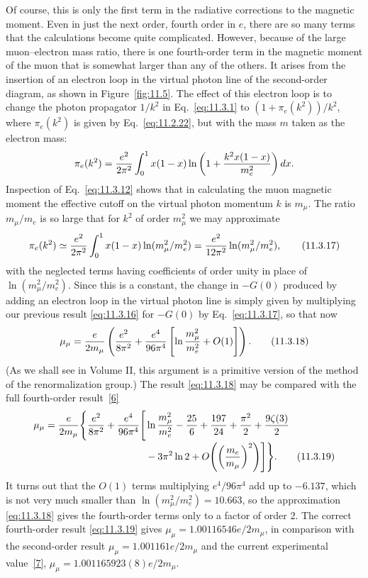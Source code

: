 Of course, this is only the first term in the radiative corrections to the
magnetic moment. Even in just the next order, fourth order in $e$, there are
so many terms that the calculations become quite complicated. However,
because of the large muon--electron mass ratio, there is one fourth-order term
in the magnetic moment of the muon that is somewhat larger than any of the
others. It arises from the insertion of an electron loop in the virtual photon
line of the second-order diagram, as shown in Figure~\ref{fig:11.5}. The effect of this
electron loop is to change the photon propagator $1/k^2$ in Eq.~\eqref{eq:11.3.1} to
$(1+\pi_e(k^2))/k^2$, where $\pi_e(k^2)$ is given by Eq.~\eqref{eq:11.2.22}, but with
the mass $m$ taken as the electron mass:
\[
\pi_e(k^2)={e^2\over2\pi^2}\int_0^1x(1-x)
 \ln\left(1+{k^2x(1-x)\over m_e^2}\right)dx.
\]
Inspection of Eq.~\eqref{eq:11.3.12} shows that in calculating the muon magnetic
moment the effective cutoff on the virtual photon momentum $k$ is $m_\mu$.
The ratio $m_\mu/m_e$ is so large that for $k^2$ of order $m_\mu^2$ we may
approximate
\begin{equation}
\pi_e(k^2)\simeq{e^2\over2\pi^2}\int_0^1x(1-x)
 \ln(m_\mu^2/m_e^2)
 ={e^2\over12\pi^2}\ln(m_\mu^2/m_e^2),
\tag{11.3.17}\label{eq:11.3.17}
\end{equation}
with the neglected terms having coefficients of order unity in place of
$\ln(m_\mu^2/m_e^2)$. Since this is a constant, the change in $-G(0)$
produced by adding an electron loop in the virtual photon line is simply
given by multiplying our previous result \eqref{eq:11.3.16} for $-G(0)$ by
Eq.~\eqref{eq:11.3.17}, so that now
\begin{equation}
\mu_\mu={e\over2m_\mu}\left({e^2\over8\pi^2}
 +{e^4\over96\pi^4}\left[\ln{m_\mu^2\over m_e^2}+O(1)\right]\right).
\tag{11.3.18}\label{eq:11.3.18}
\end{equation}
(As we shall see in Volume II, this argument is a primitive version of the
method of the renormalization group.) The result \eqref{eq:11.3.18} may be compared
with the full fourth-order result~\hyperref[ref:11.6]{[6]}
\begin{align}
\mu_\mu={e\over2m_\mu}\Biggl\{{e^2\over8\pi^2}
 +{e^4\over96\pi^4}\Biggl[&\ln{m_\mu^2\over m_e^2}-{25\over6}
 +{197\over24}+{\pi^2\over2}+{9\zeta(3)\over2}
\notag\\[-2pt]
&-3\pi^2\ln2+O\!\left(\left({m_e\over m_\mu}\right)^2\right)\Biggr]
 \Biggr\}.
\tag{11.3.19}\label{eq:11.3.19}
\end{align}
It turns out that the $O(1)$ terms multiplying $e^4/96\pi^4$ add up to
$-6.137$, which is not very much smaller than
$\ln(m_\mu^2/m_e^2)=10.663$, so the approximation \eqref{eq:11.3.18} gives the
fourth-order terms only to a factor of order 2. The correct fourth-order
result \eqref{eq:11.3.19} gives $\mu_\mu=1.00116546e/2m_\mu$, in comparison with the
second-order result $\mu_\mu=1.001161e/2m_\mu$ and the current experimental
value~\hyperref[ref:11.7]{[7]}, $\mu_\mu=1.001165923(8)e/2m_\mu$.

